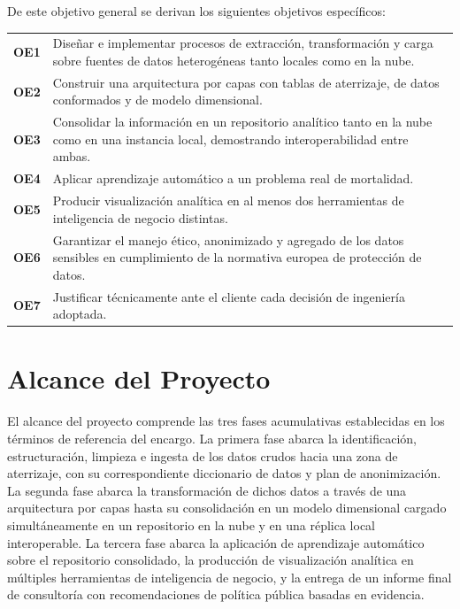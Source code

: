 \documentclass[12pt,a4paper]{article}
\begin{document}
De este objetivo general se derivan los siguientes objetivos específicos:

\vspace{4pt}
{\small
\begin{tabular}{@{} >{\bfseries}p{0.6cm} p{13cm} @{}}
  OE1 & Diseñar e implementar procesos de extracción, transformación y carga sobre fuentes de
        datos heterogéneas tanto locales como en la nube. \\[5pt]
  OE2 & Construir una arquitectura por capas con tablas de aterrizaje, de datos conformados y
        de modelo dimensional. \\[5pt]
  OE3 & Consolidar la información en un repositorio analítico tanto en la nube como en una
        instancia local, demostrando interoperabilidad entre ambas. \\[5pt]
  OE4 & Aplicar aprendizaje automático a un problema real de mortalidad. \\[5pt]
  OE5 & Producir visualización analítica en al menos dos herramientas de inteligencia de
        negocio distintas. \\[5pt]
  OE6 & Garantizar el manejo ético, anonimizado y agregado de los datos sensibles en
        cumplimiento de la normativa europea de protección de datos. \\[5pt]
  OE7 & Justificar técnicamente ante el cliente cada decisión de ingeniería adoptada. \\
\end{tabular}
}

\section{Alcance del Proyecto}

El alcance del proyecto comprende las tres fases acumulativas establecidas en los términos de
referencia del encargo. La primera fase abarca la identificación, estructuración, limpieza e
ingesta de los datos crudos hacia una zona de aterrizaje, con su correspondiente diccionario de
datos y plan de anonimización. La segunda fase abarca la transformación de dichos datos a través
de una arquitectura por capas hasta su consolidación en un modelo dimensional cargado
simultáneamente en un repositorio en la nube y en una réplica local interoperable. La tercera
fase abarca la aplicación de aprendizaje automático sobre el repositorio consolidado, la
producción de visualización analítica en múltiples herramientas de inteligencia de negocio, y la
entrega de un informe final de consultoría con recomendaciones de política pública basadas en
evidencia.
\end{document}
